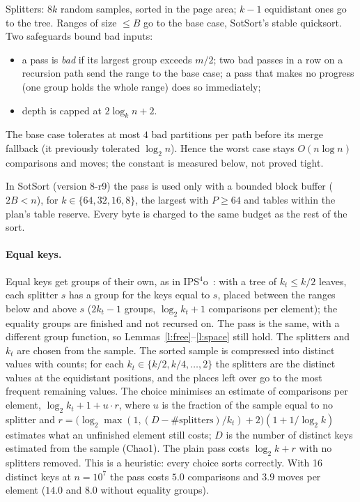 \documentclass[11pt]{article}
\theoremstyle{remark}
\renewcommand{\lg}{\log_2}
\begin{document}
Splitters: $8k$ random samples, sorted in the page area; $k-1$ equidistant ones
go to the tree. Ranges of size $\le B$ go to the base case, SotSort's stable
quicksort. Two safeguards bound bad inputs:
\begin{itemize}
\item a pass is \emph{bad} if its largest group exceeds $m/2$; two bad passes in a row on a
recursion path send the range to the base case; a pass that makes no progress
(one group holds the whole range) does so immediately;
\item depth is capped at $2\log_k n+2$.
\end{itemize}
The base case tolerates at most $4$ bad partitions per path before its merge
fallback (it previously tolerated $\lg n$). Hence the worst case stays
$O(n\log n)$ comparisons and moves; the constant is measured below, not proved tight.

In SotSort (version 8-r9) the pass is used only with a bounded block buffer
($2B<n$), for $k\in\{64,32,16,8\}$, the largest with $P\ge64$ and tables within
the plan's table reserve. Every byte is charged to the same budget as the rest
of the sort.

\paragraph{Equal keys.} Equal keys get groups of their own, as in IPS$^4$o~\cite{ips4o}: with a
tree of $k_t\le k/2$ leaves, each splitter $s$ has a group for the keys equal to $s$, placed
between the ranges below and above $s$ ($2k_t-1$ groups, $\lg k_t+1$ comparisons per element);
the equality groups are finished and not recursed on. The pass is the same, with a different
group function, so Lemmas~\ref{l:free}--\ref{l:space} still hold. The splitters and $k_t$ are
chosen from the sample. The sorted sample is compressed into distinct values with counts; for
each $k_t\in\{k/2,k/4,\dots,2\}$ the splitters are the distinct values at the equidistant
positions, and the places left over go to the most frequent remaining values. The choice
minimises an estimate of comparisons per element,
$\lg k_t+1+u\cdot r$, where $u$ is the fraction of the sample equal to no splitter and
$r=\bigl(\lg\max(1,(D-\#\text{splitters})/k_t)+2\bigr)(1+1/\lg k)$ estimates what an unfinished
element still costs; $D$ is the number of distinct keys estimated from the sample (Chao1).
The plain pass costs $\lg k+r$ with no splitters removed. This is a heuristic: every choice
sorts correctly. With 16 distinct keys at $n=10^7$ the pass costs $5.0$ comparisons and $3.9$
moves per element ($14.0$ and $8.0$ without equality groups).
\end{document}
